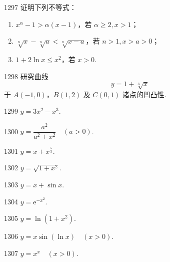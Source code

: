 \begin{prob}[L]{1297}
证明下列不等式：
\begin{enumerate}[label=(\alph*), itemsep=2pt, topsep=3pt]
\item $x^\alpha - 1 > \alpha(x - 1)$，若 $\alpha \geqslant 2, x > 1$；
\item $\sqrt[n]{x} - \sqrt[n]{a} < \sqrt[n]{x - a}$，若 $n > 1, x > a > 0$；
\item $1 + 2\ln x \leqslant x^2$，若 $x > 0$.
\end{enumerate}
\end{prob}


\begin{prob}[M]{1298}
研究曲线
\[
y = 1 + \sqrt[3]{x}
\]
于 $A(-1, 0)$，$B(1, 2)$ 及 $C(0, 1)$ 诸点的凹凸性.
\end{prob}


\begin{prob}[S]{1299}
$y = 3x^2 - x^3$.
\end{prob}

\begin{prob}[S]{1300}
$y = \dfrac{a^2}{a^2 + x^2} \quad (a > 0)$.
\end{prob}

\begin{prob}[S]{1301}
$y = x + x^{\frac{5}{3}}$.
\end{prob}

\begin{prob}[S]{1302}
$y = \sqrt{1 + x^2}$.
\end{prob}

\begin{prob}[S]{1303}
$y = x + \sin x$.
\end{prob}

\begin{prob}[S]{1304}
$y = \mathrm{e}^{-x^2}$.
\end{prob}

\begin{prob}[S]{1305}
$y = \ln(1 + x^2)$.
\end{prob}

\begin{prob}[S]{1306}
$y = x \sin(\ln x) \quad (x > 0)$.
\end{prob}

\begin{prob}[S]{1307}
$y = x^x \quad (x > 0)$.
\end{prob}

